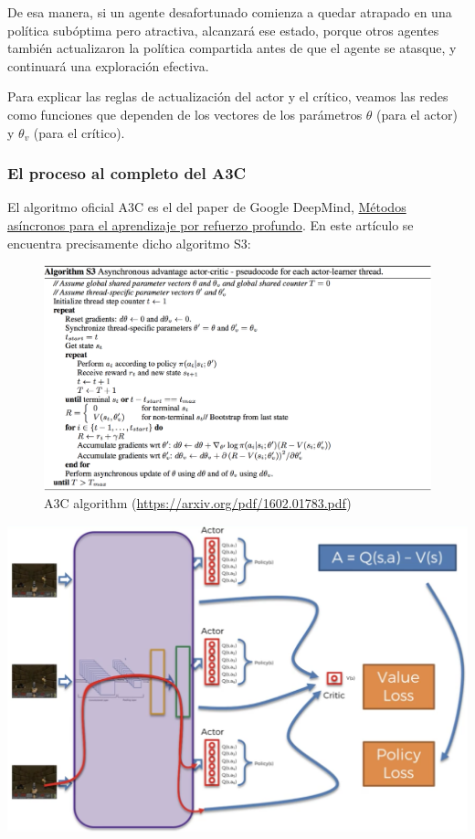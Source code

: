 \documentclass[]{book}
\begin{document}
De esa manera, si un agente desafortunado comienza a quedar atrapado en una política subóptima pero atractiva, alcanzará ese estado, porque otros agentes también actualizaron la política compartida antes de que el agente se atasque, y continuará una exploración efectiva.

Para explicar las reglas de actualización del actor y el crítico, veamos las redes como funciones que dependen de los vectores de los parámetros \(\theta\) (para el actor) y \(\theta_v\) (para el crítico).

\hypertarget{el-proceso-al-completo-del-a3c}{%
\subsubsection{El proceso al completo del A3C}\label{el-proceso-al-completo-del-a3c}}

El algoritmo oficial A3C es el del paper de Google DeepMind, \href{https://arxiv.org/pdf/1602.01783.pdf}{Métodos asíncronos para el aprendizaje por refuerzo profundo}. En este artículo se encuentra precisamente dicho algoritmo S3:

\begin{figure}
\centering
\includegraphics{Images/S3.png}
\caption{A3C algorithm (\url{https://arxiv.org/pdf/1602.01783.pdf})}
\end{figure}

\includegraphics{Images/A3C.png}
\end{document}
